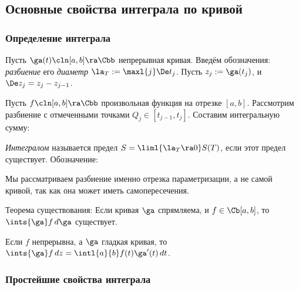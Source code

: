\documentclass[a4paper]{article}
\begin{document}
\begin{solution}
\subsection{Основные свойства интеграла по кривой}

\subsubsection{Определение интеграла}

Пусть $\ga(t)\cln [a,b]\ra\Cbb$ непрерывная кривая. Введём обозначения: \emph{разбиение}
его \emph{диаметр} $\la_T := \maxl{j} \De t_j$. Пусть $z_j := \ga(t_j)$, и $\De z_j = z_j - z_{j-1}$.

Пусть $f\cln[a,b] \ra \Cbb$ произвольная функция на отрезке $[a,b]$. Рассмотрим разбиение
с отмеченными точками $Q_j \in [t_{j - 1}, t_j]$. Составим интегральную сумму:

\begin{df}
\emph{Интегралом} называется предел $S = \liml{\la_T \ra 0} S(T)$, если этот предел существует.
Обозначение:
\end{df}

\begin{note}
Мы рассматриваем разбиение именно отрезка параметризации, а не самой кривой, так как она может
иметь самопересечения.
\end{note}

\begin{problem}
\begin{nums}{-2}
\item Теорема существования: Если кривая $\ga$ спрямляема, и $f\in\Cb[a,b]$, то $\ints{\ga} f\,d\ga$ существует.
\item Если $f$ непрерывна, а $\ga$ гладкая кривая, то $\ints{\ga} f\,dz = \intl{a}{b}f(t)\ga'(t)\,dt$.
\end{nums}
\end{problem}

\subsubsection{Простейшие свойства интеграла}


\end{solution}
\end{document}
